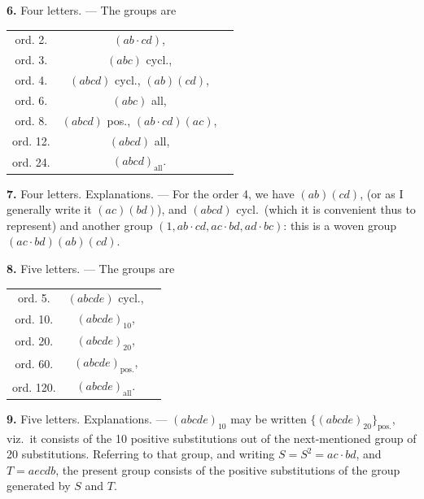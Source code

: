 \documentclass[11pt,a4paper]{book}
\begin{document}
\vspace{0.5em}
\textbf{6.} Four letters. --- The groups are
\begin{center}
\begin{tabular}{ccl}
ord.  2. & $(ab \cdot cd)$, \\
ord.  3. & $(abc)$ cycl., \\
ord.  4. & $(abcd)$ cycl., $(ab)(cd)$, \\
ord.  6. & $(abc)$ all, \\
ord.  8. & $(abcd)$ pos., $(ab \cdot cd)(ac)$, \\
ord. 12. & $(abcd)$ all, \\
ord. 24. & $(abcd)_{\text{all}}$.
\end{tabular}
\end{center}

\vspace{0.5em}
\textbf{7.} Four letters. Explanations. --- For the order 4, we have $(ab)(cd)$, (or as I generally write it $(ac)(bd)$), and $(abcd)$ cycl.\ (which it is convenient thus to represent) and another group $(1, ab \cdot cd, ac \cdot bd, ad \cdot bc)$: this is a woven group $(ac \cdot bd)(ab)(cd)$.

\vspace{0.5em}
\textbf{8.} Five letters. --- The groups are
\begin{center}
\begin{tabular}{ccl}
ord.  5. & $(abcde)$ cycl., \\
ord. 10. & $(abcde)_{10}$, \\
ord. 20. & $(abcde)_{20}$, \\
ord. 60. & $(abcde)_{\text{pos.}}$, \\
ord. 120. & $(abcde)_{\text{all}}$.
\end{tabular}
\end{center}

\vspace{0.5em}
\textbf{9.} Five letters. Explanations. --- $(abcde)_{10}$ may be written $\{(abcde)_{20}\}_{\text{pos.}}$, viz.\ it consists of the 10 positive substitutions out of the next-mentioned group of 20 substitutions. Referring to that group, and writing $S = S^2 = ac \cdot bd$, and $T = aecdb$, the present group consists of the positive substitutions of the group generated by $S$ and $T$.
\end{document}

